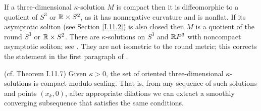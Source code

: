 If a three-dimensional $\kappa$-solution $M$ is compact then it is
diffeomorphic to a quotient of $S^3$ or ${\mathbb R} \times S^2$, as it has
nonnegative curvature and is nonflat.
If its asymptotic
soliton (see Section \ref{I.11.2}) is also closed then
$M$ is a quotient of the round $S^3$ or ${\mathbb R} \times S^2$.
There are $\kappa$-solutions on $S^3$ and ${\mathbb R} P^3$ with noncompact
asymptotic soliton; see \cite[Section 1.4]{Perelman2}.
They are not isometric to the round metric; this corrects the statement in
the first paragraph of \cite[Section 11.7]{Perelman}.
\begin{theorem}
  \label{thm:kl-compactness-space-three-dimensional-solutions-compactness-kappa-solutions}
 (cf. Theorem I.11.7) \label{thmI.11.7}
Given $\kappa > 0$, the set of oriented
three-dimensional $\kappa$-solutions is compact modulo scaling.  That is, from any
sequence of such solutions and points $(x_k, 0)$,
after appropriate dilations
we can extract a
smoothly converging subsequence that satisfies the same conditions.
\end{theorem}
